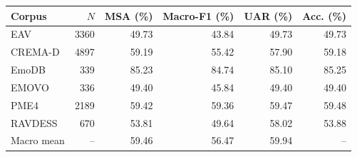 \begin{tabular}{lrrrrr}
\hline
Corpus & $N$ & MSA (\%) & Macro-F1 (\%) & UAR (\%) & Acc. (\%) \\
\hline
EAV & 3360 & 49.73 & 43.84 & 49.73 & 49.73 \\
CREMA-D & 4897 & 59.19 & 55.42 & 57.90 & 59.18 \\
EmoDB & 339 & 85.23 & 84.74 & 85.10 & 85.25 \\
EMOVO & 336 & 49.40 & 45.84 & 49.40 & 49.40 \\
PME4 & 2189 & 59.42 & 59.36 & 59.47 & 59.48 \\
RAVDESS & 670 & 53.81 & 49.64 & 58.02 & 53.88 \\
\hline
Macro mean & -- & 59.46 & 56.47 & 59.94 & -- \\
\hline
\end{tabular}